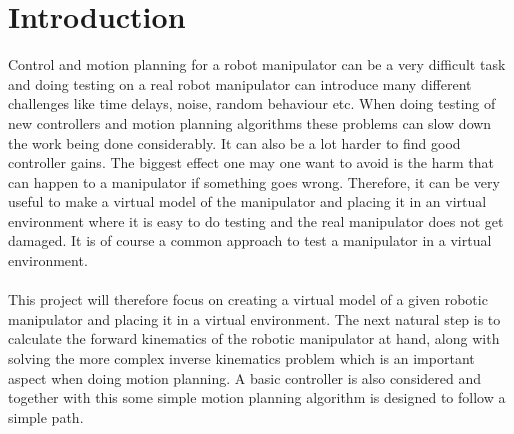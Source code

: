 \chapter{Introduction}

Control and motion planning for a robot manipulator can be a very difficult task and doing testing on a real robot manipulator can introduce many different challenges like time delays, noise, random behaviour etc. When doing testing of new controllers and motion planning algorithms these problems can slow down the work being done considerably. It can also be a lot harder to find good controller gains. The biggest effect one may one want to avoid is the harm that can happen to a manipulator if something goes wrong. Therefore, it can be very useful to make a virtual model of the manipulator and placing it in an virtual environment where it is easy to do testing and the real manipulator does not get damaged. It is of course a common approach to test a manipulator in a virtual environment.\\\\
This project will therefore focus on creating a virtual model of a given robotic manipulator and placing it in a virtual environment. The next natural step is to calculate the forward kinematics of the robotic manipulator at hand, along with solving the more complex inverse kinematics problem which is an important aspect when doing motion planning. A basic controller is also considered and together with this some simple motion planning algorithm is designed to follow a simple path. \\\\
    





